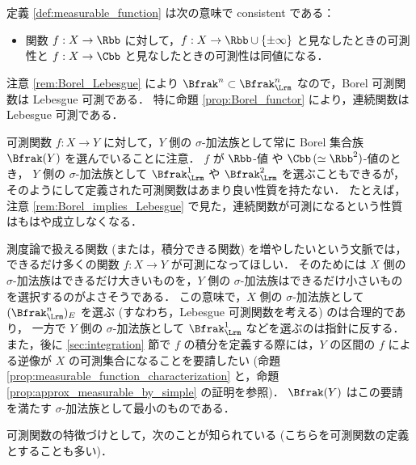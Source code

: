 \begin{remark}
    定義 \ref{def:measurable_function} は次の意味で consistent である：
    \begin{itemize}
        \item 関数 $f:X\to\Rbb$ に対して，$f:X\to\Rbb\cup\{\pm\infty\}$ と見なしたときの可測性と
        $f:X\to\Cbb$ と見なしたときの可測性は同値になる．
    \end{itemize}
\end{remark}

\begin{remark}\label{rem:Borel_implies_Lebesgue}
    注意 \ref{rem:Borel_Lebesgue} により $\Bfrak^n\subset\Bfrak_\Lrm^n$ なので，Borel 可測関数は Lebesgue 可測である．
    特に命題 \ref{prop:Borel_functor} により，連続関数は Lebesgue 可測である．
\end{remark}

\begin{remark}[\!\!\cite{mo31603}]
    可測関数 $f:X\to Y$ に対して，$Y$ 側の $\sigma$-加法族として常に Borel 集合族 $\Bfrak(Y)$ を選んでいることに注意．
    $f$ が $\Rbb$-値 や $\Cbb\,(\simeq\Rbb^2)$-値のとき，
    $Y$ 側の $\sigma$-加法族として $\Bfrak_\Lrm^1$ や $\Bfrak_\Lrm^2$ を選ぶこともできるが，
    そのようにして定義された可測関数はあまり良い性質を持たない．
    たとえば，注意 \ref{rem:Borel_implies_Lebesgue} で見た，連続関数が可測になるという性質はもはや成立しなくなる．

    測度論で扱える関数 (または，積分できる関数) を増やしたいという文脈では，できるだけ多くの関数 $f:X\to Y$ が可測になってほしい．
    そのためには $X$ 側の $\sigma$-加法族はできるだけ大きいものを，$Y$ 側の $\sigma$-加法族はできるだけ小さいものを選択するのがよさそうである．
    この意味で，$X$ 側の $\sigma$-加法族として $(\Bfrak_\Lrm^n)_E$ を選ぶ (すなわち，Lebesgue 可測関数を考える) のは合理的であり，
    一方で $Y$ 側の $\sigma$-加法族として $\Bfrak_\Lrm^1$ などを選ぶのは指針に反する．
    また，後に \ref{sec:integration} 節で $f$ の積分を定義する際には，$Y$ の区間の $f$ による逆像が $X$ の可測集合になることを要請したい
    (命題 \ref{prop:measurable_function_characterization} と，命題 \ref{prop:approx_measurable_by_simple} の証明を参照)．
    $\Bfrak(Y)$ はこの要請を満たす $\sigma$-加法族として最小のものである．
\end{remark}

可測関数の特徴づけとして，次のことが知られている (こちらを可測関数の定義とすることも多い)．

